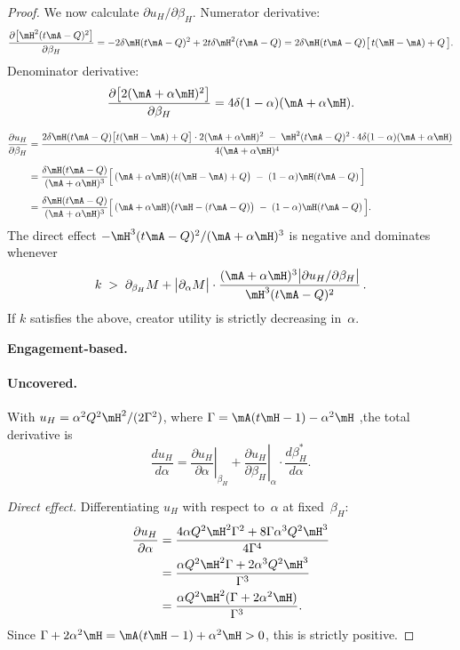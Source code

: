 \begin{proof}
We now calculate $\partial u_H / \partial \beta_H$. Numerator derivative:
\[
\frac{\partial\bigl[\mH^2(t\mA-Q)^2\bigr]}{\partial\beta_H}
= -2\delta\mH(t\mA-Q)^2 + 2t\delta\mH^2(t\mA-Q)
= 2\delta\mH(t\mA-Q)\bigl[\,t(\mH-\mA)+Q\,\bigr].
\]
Denominator derivative:
\[
\frac{\partial\bigl[2(\mA+\alpha\mH)^2\bigr]}{\partial\beta_H}
= 4\delta(1-\alpha)(\mA+\alpha\mH).
\]

\begin{align*}
\frac{\partial u_H}{\partial\beta_H}
&= \frac{2\delta\mH(t\mA-Q)\bigl[t(\mH-\mA)+Q\bigr]\cdot 2(\mA+\alpha\mH)^2 \;-\; \mH^2(t\mA-Q)^2 \cdot 4\delta(1-\alpha)(\mA+\alpha\mH)}{4(\mA+\alpha\mH)^4}\\[6pt]
&= \frac{\delta\mH(t\mA-Q)}{(\mA+\alpha\mH)^3}\Bigl[\,(\mA+\alpha\mH)\bigl(t(\mH-\mA)+Q\bigr) \;-\; (1-\alpha)\mH(t\mA-Q)\,\Bigr]\\[4pt]
&= \frac{\delta\mH(t\mA-Q)}{(\mA+\alpha\mH)^3}\Bigl[\,(\mA+\alpha\mH)\bigl(t\mH-(t\mA-Q)\bigr) \;-\; (1-\alpha)\mH(t\mA-Q)\,\Bigr].
\end{align*}
The direct effect $-\mH^3 (t\mA-Q)^2/(\mA+\alpha\mH)^3$ is negative and dominates whenever
\begin{equation}\label{eq:kbar-alpha-uc-V-bnd}
k \;>\;  \partial_{\beta_H} M
+ \bigl|\partial_\alpha M\bigr|\cdot
\frac{(\mA+\alpha\mH)^3\bigl|\partial u_H/\partial\beta_H\bigr|}{\mH^3 (t\mA-Q)^2}\,.
\end{equation}
If $k$ satisfies the above, creator utility is strictly decreasing in~$\alpha$.


\textbf{Engagement-based.}
\paragraph{Uncovered.}
With $u_H = \alpha^2 Q^2\mH^2/(2\Gamma^2)$, where $\Gamma = \mA(t\mH-1)-\alpha^2\mH$ ,the total derivative is
\begin{equation}\label{eq:duc-total-E}
\frac{du_H}{d\alpha}
= \left.\frac{\partial u_H}{\partial\alpha}\right|_{\beta_H}
+ \left.\frac{\partial u_H}{\partial\beta_H}\right|_{\alpha} \cdot \frac{d\beta_H^*}{d\alpha}.
\end{equation}
 
\textit{Direct effect.}\; Differentiating $u_H$ with respect to~$\alpha$ at fixed~$\beta_H$:
\begin{align}
\frac{\partial u_H}{\partial\alpha}
& = \dfrac{4\alpha Q^2\mH^2\Gamma^2 + 8\Gamma \alpha^3 Q^2 \mH^3}{4\Gamma^4} \notag\\
& = \dfrac{\alpha Q^2\mH^2\Gamma +  2\alpha^3 Q^2 \mH^3}{\Gamma^3} \notag\\
&= \frac{\alpha Q^2\mH^2(\Gamma + 2\alpha^2\mH)}{\Gamma^3}. \label{eq:duc-direct-E}
\end{align}
Since $\Gamma + 2\alpha^2\mH = \mA(t\mH-1) + \alpha^2\mH > 0$, this is strictly positive.
 

\end{proof}
